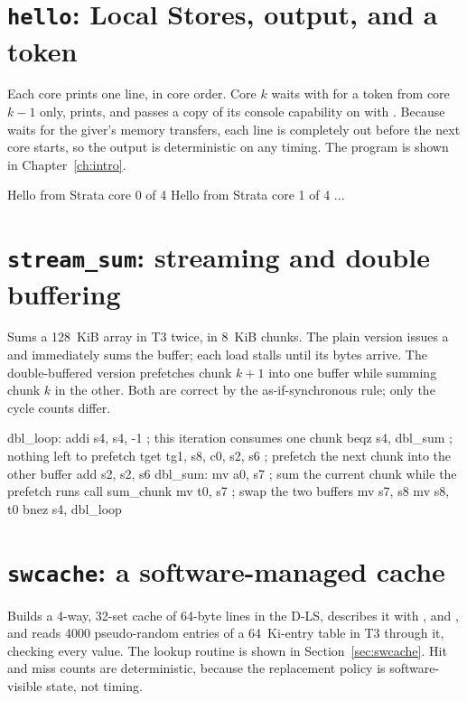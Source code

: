\section{\texttt{hello}: Local Stores, output, and a token}\label{sec:ex-hello}
Each core prints one line, in core order. Core $k$ waits with  for a token from core
$k-1$ only, prints, and passes a copy of its console capability on with . Because
 waits for the giver's memory transfers, each line is completely out before the next core starts,
so the output is deterministic on any timing. The program is shown in Chapter~\ref{ch:intro}.

\begin{shell}
Hello from Strata core 0 of 4
Hello from Strata core 1 of 4
...
\end{shell}

\section{\texttt{stream\_sum}: streaming and double buffering}\label{sec:ex-stream}
Sums a 128~KiB array in T3 twice, in 8~KiB chunks. The plain version issues a  and immediately sums the buffer;
each load stalls until its bytes arrive. The double-buffered version prefetches chunk $k+1$ into one
buffer while summing chunk $k$ in the other. Both are correct by the as-if-synchronous rule; only the
cycle counts differ.

\begin{asm}
dbl_loop:
        addi  s4, s4, -1                ; this iteration consumes one chunk
        beqz  s4, dbl_sum               ; nothing left to prefetch
        tget  tg1, s8, c0, s2, s6       ; prefetch the next chunk into the other buffer
        add   s2, s2, s6
dbl_sum:
        mv    a0, s7                    ; sum the current chunk while the prefetch runs
        call  sum_chunk
        mv    t0, s7                    ; swap the two buffers
        mv    s7, s8
        mv    s8, t0
        bnez  s4, dbl_loop
\end{asm}

\section{\texttt{swcache}: a software-managed cache}\label{sec:ex-swcache}
Builds a 4-way, 32-set cache of 64-byte lines in the D-LS, describes it with ,  and
, and reads 4000 pseudo-random entries of a 64~Ki-entry table in T3 through it, checking every
value. The lookup routine is shown in Section~\ref{sec:swcache}. Hit and miss counts are deterministic,
because the replacement policy is software-visible state, not timing.

